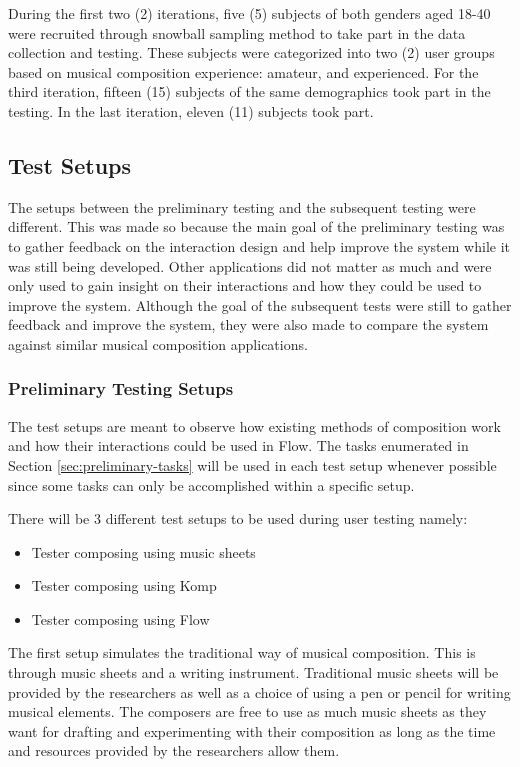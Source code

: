 		During the first two (2) iterations, five (5) subjects of both genders aged 18-40 were recruited through snowball sampling method to take part in the data collection and testing. These subjects were categorized into two (2) user groups based on musical composition experience: amateur, and experienced. For the third iteration, fifteen (15) subjects of the same demographics took part in the testing. In the last iteration, eleven (11) subjects took part. 


		\subsection{Test Setups}
		\label{sec:test-setups}

			The setups between the preliminary testing and the subsequent testing were different. This was made so because the main goal of the preliminary testing was to gather feedback on the interaction design and help improve the system while it was still being developed. Other applications did not matter as much and were only used to gain insight on their interactions and how they could be used to improve the system. Although the goal of the subsequent tests were still to gather feedback and improve the system, they were also made to compare the system against similar musical composition applications. 

			\subsubsection{Preliminary Testing Setups}

				The test setups are meant to observe how existing methods of composition work and how their interactions could be used in Flow. The tasks enumerated in Section \ref{sec:preliminary-tasks} will be used in each test setup whenever possible since some tasks can only be accomplished within a specific setup. 

				There will be 3 different test setups to be used during user testing namely:

				\begin{itemize}
					\item Tester composing using music sheets
					\item Tester composing using Komp
					\item Tester composing using Flow
				\end{itemize}

				The first setup simulates the traditional way of musical composition. This is through music sheets and a writing instrument. Traditional music sheets will be provided by the researchers as well as a choice of using a pen or pencil for writing musical elements. The composers are free to use as much music sheets as they want for drafting and experimenting with their composition as long as the time and resources provided by the researchers allow them.


